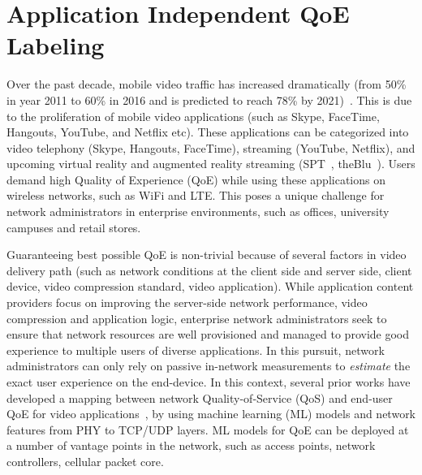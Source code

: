 \section{Application Independent QoE Labeling}


Over the past decade, mobile video traffic has increased dramatically (from 50\% in year 2011 to 60\% in 2016 and is predicted to reach 78\% by 2021)~\cite{forecast2016cisco}. This is due to the proliferation of mobile video applications (such as Skype, FaceTime, Hangouts, YouTube, and Netflix etc). These applications can be categorized into video telephony (Skype, Hangouts, FaceTime), streaming (YouTube, Netflix), and upcoming virtual reality and augmented reality streaming (SPT~\cite{spt}, theBlu~\cite{theblu}). 
Users demand high Quality of Experience (QoE) while using these applications on wireless networks, such as WiFi and LTE. This poses a unique challenge for network administrators in enterprise environments, such as offices, university campuses and retail stores.

Guaranteeing best possible QoE is non-trivial because of several factors in video delivery path (such as network conditions at the client side and server side, client device, video compression standard, video application). While application content providers focus on improving the server-side network performance, video compression and application logic, enterprise network administrators seek to ensure that network resources are well provisioned and managed to provide good experience to multiple users of diverse applications. In this pursuit, network administrators can only rely on passive in-network measurements to {\em estimate} the exact user experience on the end-device. In this context, several prior works have developed a mapping between network Quality-of-Service (QoS) and end-user QoE for video applications~\cite{balachandran2013developing,aggarwal2014prometheus,fiedler2010generic}, by using machine learning (ML) models and network features from PHY to TCP/UDP layers. ML models for QoE can be deployed at a number of vantage points in the network, such as access points, network controllers, cellular packet core. 

